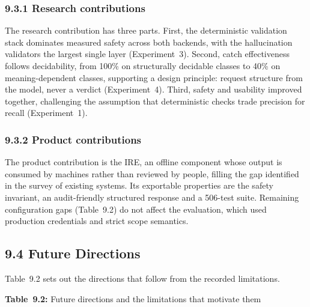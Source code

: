 \documentclass[
]{article}
\begin{document}
\hypertarget{research-contributions}{%
\subsubsection{9.3.1 Research
contributions}\label{research-contributions}}

The research contribution has three parts. First, the deterministic
validation stack dominates measured safety across both backends, with
the hallucination validators the largest single layer (Experiment~3).
Second, catch effectiveness follows decidability, from 100\% on
structurally decidable classes to 40\% on meaning-dependent classes,
supporting a design principle: request structure from the model, never a
verdict (Experiment~4). Third, safety and usability improved together,
challenging the assumption that deterministic checks trade precision for
recall (Experiment~1).

\hypertarget{product-contributions}{%
\subsubsection{9.3.2 Product
contributions}\label{product-contributions}}

The product contribution is the IRE, an offline component whose output
is consumed by machines rather than reviewed by people, filling the gap
identified in the survey of existing systems. Its exportable properties
are the safety invariant, an audit-friendly structured response and a
506-test suite. Remaining configuration gaps (Table~9.2) do not affect
the evaluation, which used production credentials and strict scope
semantics.

\hypertarget{future-directions}{%
\subsection{9.4 Future Directions}\label{future-directions}}

Table~9.2 sets out the directions that follow from the recorded
limitations.

\protect\hypertarget{_Toc900167}{}{}\textbf{Table~9.2:} Future
directions and the limitations that motivate them
\end{document}
